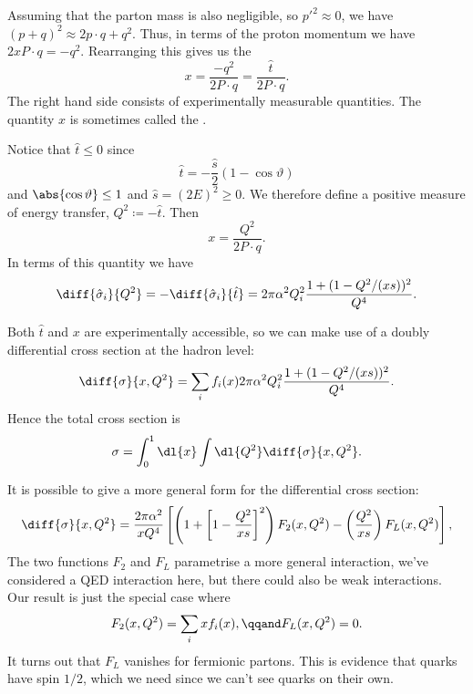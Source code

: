\documentclass[fleqn]{NotesClass}
\begin{document}
    Assuming that the parton mass is also negligible, so \(p'^2 \approx 0\), we have \((p + q)^2 \approx 2p \cdot q + q^2\).
    Thus, in terms of the proton momentum we have \(2x P \cdot q = -q^2\).
    Rearranging this gives us the 
    \begin{equation}
        x = \frac{-q^2}{2P \cdot q} = \frac{\hat{t}}{2P \cdot q}.
    \end{equation}
    The right hand side consists of experimentally measurable quantities.
    The quantity \(x\) is sometimes called the .
    
    Notice that \(\hat{t} \le 0\) since
    \begin{equation}
        \hat{t} = -\frac{\hat{s}}{2}(1 - \cos\vartheta)
    \end{equation}
    and \(\abs{\cos\vartheta} \le 1\) and \(\hat{s} = (2E)^2 \ge 0\).
    We therefore define a positive measure of energy transfer, \(Q^2 \coloneqq -\hat{t}\).
    Then
    \begin{equation}
        x = \frac{Q^2}{2P\cdot q}.
    \end{equation}
    In terms of this quantity we have
    \begin{equation}
        \diff{\hat{\sigma}_i}{Q^2} = -\diff{\hat{\sigma}_i}{\hat{t}} = 2\pi\alpha^2 Q_i^2 \frac{1 + (1 - Q^2/(xs))^2}{Q^4}.
    \end{equation}
    
    Both \(\hat{t}\) and \(x\) are experimentally accessible, so we can make use of a doubly differential cross section at the hadron level:
    \begin{equation}
        \diff{\sigma}{x,Q^2} = \sum_i f_i(x) 2\pi \alpha^2 Q_i^2 \frac{1 + (1 - Q^2/(xs))^2}{Q^4}.
    \end{equation}
    Hence the total cross section is
    \begin{equation}
        \sigma = \int_0^1 \dl{x} \int \dl{Q^2} \diff{\sigma}{x,Q^2}.
    \end{equation}
    
    It is possible to give a more general form for the differential cross section:
    \begin{equation}
        \diff{\sigma}{x,Q^2} = \frac{2\pi\alpha^2}{xQ^4} \left[ \left( 1 + \left[ 1 - \frac{Q^2}{xs} \right]^2 \right) F_2(x, Q^2) - \left( \frac{Q^2}{xs} \right) F_{L}(x, Q^2) \right],
    \end{equation}
    The two functions \(F_2\) and \(F_L\) parametrise a more general interaction, we've considered a QED interaction here, but there could also be weak interactions.
    Our result is just the special case where
    \begin{equation}
        F_2(x, Q^2) = \sum_i x f_i(x), \qqand F_L(x, Q^2) = 0.
    \end{equation}
    It turns out that \(F_L\) vanishes for fermionic partons.
    This is evidence that quarks have spin \(1/2\), which we need since we can't see quarks on their own.
    
\end{document}
